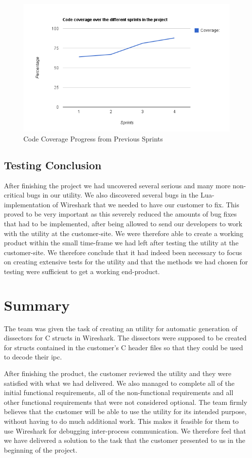 \begin{figure}[htb]
	\center
	\includegraphics[width=\textwidth]{./sprints/img/sprint4_code_coverage_chart}
	\caption{Code Coverage Progress from Previous Sprints\label{fig:sp4CoverageChart}}
\end{figure}

\subsection{Testing Conclusion}
After finishing the project we had uncovered several serious and many more non-critical bugs in our utility. We also discovered several bugs in the Lua-implementation of Wireshark that we needed to have our customer to fix. This proved to be very important as this severely reduced the amounts of bug fixes that had to be implemented, after being allowed to send our developers to work with the utility at the customer-site. We were therefore able to create a working product within the small time-frame we had left after testing the utility at the customer-site. We therefore conclude that it had indeed been necessary to focus on creating extensive tests for the utility and that the methods we had chosen for testing were sufficient to get a working end-product.


\section{Summary}
The team was given the task of creating an utility for automatic generation of dissectors for C structs in Wireshark. The dissectors were supposed to be created for structs contained in the customer's C header files so that they could be used to decode their \gls{ipc}.

After finishing the product, the customer reviewed the utility and they were satisfied with what we had delivered. We also managed to complete all of the initial functional requirements, all of the non-functional requirements and all other functional requirements that were not considered optional. The team firmly believes that the customer will be able to use the utility for its intended purpose, without having to do much additional work. This makes it feasible for them to use Wireshark for debugging inter-process communication. We therefore feel that we have delivered a solution to the task that the customer presented to us in the beginning of the project.

